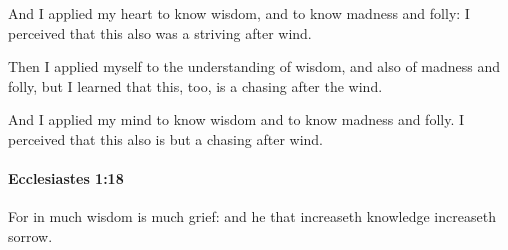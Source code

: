 			\begin{versebox}
					\item[BHS] 
					\item[LXX] 
					\item[ASV] And I applied my heart to know wisdom, and to know madness and folly: I perceived that this also was a striving after wind.
					\item[NIV] Then I applied myself to the understanding of wisdom, and also of madness and folly, but I learned that this, too, is a chasing after the wind.
					\item[NRSV] And I applied my mind to know wisdom and to know madness and folly. I perceived that this also is but a chasing after wind.
			\end{versebox}

		\paragraph{Ecclesiastes 1:18} %
			\label{ECCLESIASTES-1-18}

			For in much wisdom is much grief: and he that increaseth knowledge increaseth sorrow.

